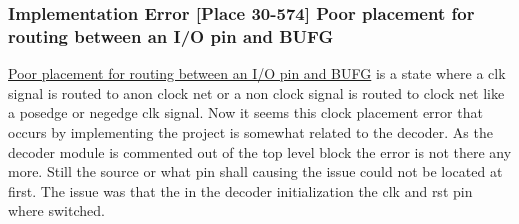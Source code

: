 \subsubsection{Implementation Error [Place 30-574] Poor placement for routing between an I/O pin and BUFG} \label{subsubsec: Poor placement for routing between an I/O pin and BUFG}
\href{https://wiki.nus.edu.sg/pages/viewpage.action?pageId=167808307}{Poor placement for routing between an I/O pin and BUFG} is a state where a clk signal is routed to anon clock net or a non clock signal is routed to clock net like a posedge or negedge clk signal.
Now it seems this clock placement error that occurs by implementing the project is somewhat related to the decoder. As the decoder module is commented out of the top level block the error is not there any more. Still the source or what pin shall causing the issue could not be located at first.
The issue was that the in the decoder initialization the clk and rst pin where switched.
